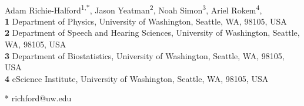 \documentclass[10pt,letterpaper]{article}
\begin{document}
\vspace*{0.2in}

\begin{flushleft}
{\Large
\textbf{} %
}
\newline
\\
Adam Richie-Halford\textsuperscript{1,*},
Jason Yeatman\textsuperscript{2},
Noah Simon\textsuperscript{3},
Ariel Rokem\textsuperscript{4},
\\
\bigskip
\textbf{1} Department of Physics, University of Washington, Seattle, WA, 98105, USA
\\
\textbf{2} Department of Speech and Hearing Sciences, University of Washington, Seattle, WA, 98105, USA
\\
\textbf{3} Department of Biostatistics, University of Washington, Seattle, WA, 98105, USA
\\
\textbf{4} e{S}cience Institute, University of Washington, Seattle, WA, 98105, USA
\\
\bigskip

%
* richford@uw.edu

\end{flushleft}





\linenumbers



\nolinenumbers



\end{document}
